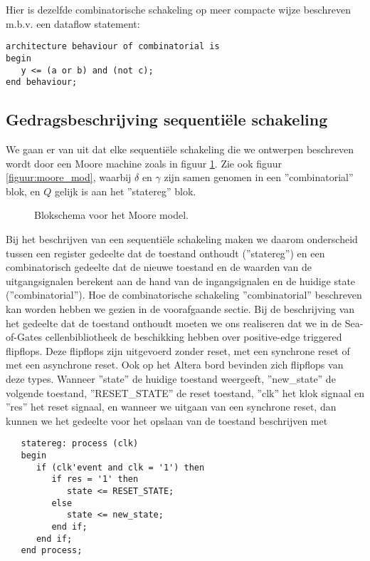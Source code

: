 Hier is dezelfde combinatorische schakeling
op meer compacte wijze beschreven m.b.v. een dataflow statement:
\begin{verbatim}
architecture behaviour of combinatorial is
begin
   y <= (a or b) and (not c);
end behaviour;
\end{verbatim}

\subsection{Gedragsbeschrijving sequenti\"ele schakeling}

We gaan er van uit dat elke sequenti\"ele schakeling die we
ontwerpen beschreven wordt door een Moore machine 
zoals in figuur \ref{figuur:vhdlfsm}.
Zie ook figuur \ref{figuur:moore_mod}, waarbij $\delta$ en $\gamma$
zijn samen genomen in een ''combinatorial'' blok, en $Q$ gelijk is
aan het ''statereg'' blok.
\begin{figure}[bth]
\centerline{}
\caption{Blokschema voor het Moore model.}
\label{figuur:vhdlfsm}
\end{figure}
Bij het beschrijven van een sequenti\"ele schakeling maken we daarom 
onderscheid tussen een register gedeelte dat 
de toestand onthoudt (''statereg'') en een combinatorisch gedeelte dat 
de nieuwe toestand en de waarden van de uitgangsignalen berekent aan de hand
van de ingangsignalen en de huidige state (''combinatorial'').
Hoe de combinatorische schakeling ''combinatorial'' beschreven kan worden 
hebben we gezien in de voorafgaande sectie. 
Bij de beschrijving van het gedeelte dat de toestand onthoudt
moeten we ons realiseren dat we in de Sea-of-Gates cellenbibliotheek
de beschikking hebben over positive-edge triggered flipflops.
Deze flipflops zijn uitgevoerd zonder reset, met een synchrone
reset of met een asynchrone reset.
Ook op het Altera bord bevinden zich flipflops van deze types.
Wanneer ''state'' de huidige toestand weergeeft, ''new\_state''
de volgende toestand, ''RESET\_STATE'' de reset toestand, ''clk''
het klok signaal en ''res'' het reset signaal, en wanneer
we uitgaan van een synchrone reset, dan kunnen
we het gedeelte voor het opslaan van de toestand beschrijven met
\begin{verbatim}
   statereg: process (clk)
   begin
      if (clk'event and clk = '1') then
         if res = '1' then
            state <= RESET_STATE;
         else
            state <= new_state;
         end if;
      end if;
   end process;
\end{verbatim}

